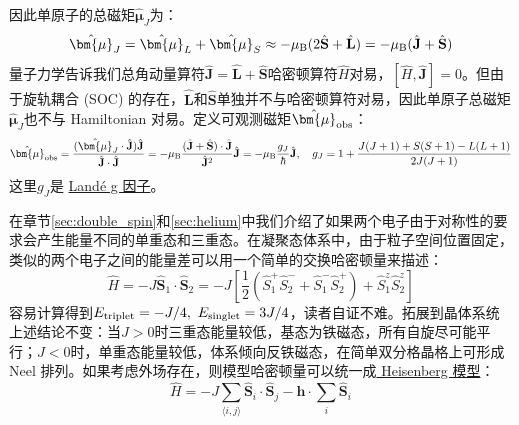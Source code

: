 因此单原子的总磁矩$\hat{\bm{\mu}}_J$为：
\[\hat{\bm{\mu}}_J=\hat{\bm{\mu}}_L+\hat{\bm{\mu}}_S\approx-\mu_{\rm B}(2\hat{\mathbf S}+\hat{\mathbf L})=-\mu_{\rm B}(\hat{\mathbf J}+\hat{\mathbf S})\]
量子力学告诉我们总角动量算符$\hat{\mathbf J}=\hat{\mathbf L}+\hat{\mathbf S}$哈密顿算符$\hat{H}$对易，$[\hat{H},\hat{\mathbf J}]=0$。但由于旋轨耦合 (SOC) 的存在，$\hat{\mathbf L}$和$\hat{\mathbf S}$单独并不与哈密顿算符对易，因此单原子总磁矩$\hat{\bm{\mu}}_J$也不与 Hamiltonian 对易。定义可观测磁矩$\hat{\bm{\mu}}_{\rm obs}$：
\[\hat{\bm{\mu}}_{\rm obs}=\frac{(\hat{\bm{\mu}}_J\cdot\hat{\mathbf{J}})\hat{\mathbf{J}}}{\hat{\mathbf{J}}\cdot\hat{\mathbf{J}}}=-\mu_{\rm B}\frac{(\hat{\mathbf J}+\hat{\mathbf S})\cdot\hat{\mathbf{J}}}{\hat{\mathbf{J}}^2}\hat{\mathbf{J}}=-\mu_{\rm B}\frac{g_J}{\hbar}\hat{\mathbf{J}}, \quad g_J=1+\frac{J(J+1)+S(S+1)-L(L+1)}{2J(J+1)}\]
这里$g_J$是 \href{https://en.wikipedia.org/wiki/Land%C3%A9_g-factor}{Landé g 因子}。

在章节\ref{sec:double_spin}和\ref{sec:helium}中我们介绍了如果两个电子由于对称性的要求会产生能量不同的单重态和三重态。在凝聚态体系中，由于粒子空间位置固定，类似的两个电子之间的能量差可以用一个简单的交换哈密顿量来描述：
\[\hat H=-J\hat{\mathbf S}_1\cdot\hat{\mathbf S}_2=-J\left[\frac{1}{2}\left(\hat{S}_1^+\hat{S}_2^-+\hat{S}_1^-\hat{S}_2^+\right)+\hat{S}_1^z\hat{S}_2^z\right]\]
容易计算得到$E_{\rm triplet}=-J/4, \ E_{\rm singlet}=3J/4$，读者自证不难。拓展到晶体系统上述结论不变：当$J>0$时三重态能量较低，基态为铁磁态，所有自旋尽可能平行；$J<0$时，单重态能量较低，体系倾向反铁磁态，在简单双分格晶格上可形成 Neel 排列。如果考虑外场存在，则模型哈密顿量可以统一成\href{https://en.wikipedia.org/wiki/Quantum_Heisenberg_model}{ Heisenberg 模型}：
\begin{equation}\label{eq:Heisenberg_model}
\hat H=-J\sum_{\langle i,j\rangle}\hat{\mathbf S}_i\cdot\hat{\mathbf S}_j-\mathbf{h}\cdot\sum_i\hat{\mathbf S}_i
\end{equation}

